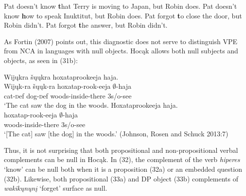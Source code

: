 \documentclass[output=paper]{LSP/langsci}
\begin{document}
\begin{exe}
\ex
\begin{xlist}
\ex
Pat doesn't know {\textbf that Terry is moving to Japan}, but Robin does.
\ex
Pat doesn't know {\textbf how to speak Inuktitut}, but Robin does.
\ex
Pat forgot {\textbf to close the door}, but Robin didn't.
\ex
Pat forgot {\textbf the answer}, but Robin didn't.
\end{xlist}
\end{exe}

As Fortin (2007) points out, this diagnostic does not serve to distinguish VPE from NCA in languages with null objects. Hoc\k{a}k allows both null subjects and objects, as seen in (31b):

\begin{exe}
\ex
\begin{xlist}
\ex
\glll Wij\k{u}kra \v{s}\k{u}\k{u}kra hoxataprookeeja haja.\\
Wij\k{u}k-ra \v{s}\k{u}\k{u}k-ra hoxatap-rook-eeja $\emptyset$-haja\\
cat-{\textsc def} dog-{\textsc def} woods-inside-there {\textsc 3s/o}-see\\
\trans `The cat saw the dog in the woods.
\ex
\glll Hoxataprookeeja haja.\\
hoxatap-rook-eeja $\emptyset$-haja\\
woods-inside-there {\textsc 3s/o}-see\\
\trans `[The cat] saw [the dog] in the woods.' (Johnson, Rosen and Schuck 2013:7)
\end{xlist}
\end{exe}


Thus, it is not surprising that both propositional and non-propositional verbal complements can be null in Hoc\k{a}k. In (32), the complement of the verb \emph{hiperes} `know' can be null both when it is a proposition (32a) or an embedded question (32b). Likewise, both propositional (33a) and DP object (33b) complements of \emph{wakik\k{u}n\k{u}n\k{i}} `forget' surface as null.
\end{document}
